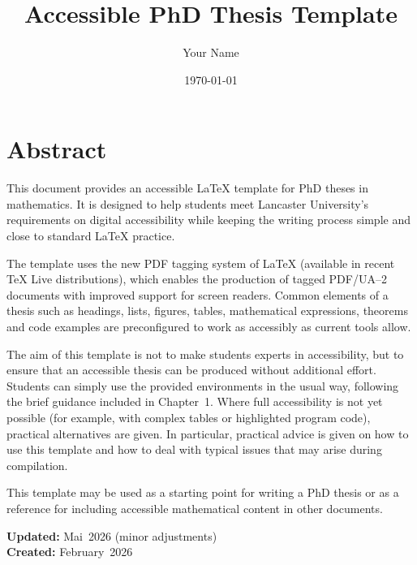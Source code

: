 \documentclass[a4paper,12pt,twoside,openright]{book}
\title{\Huge Accessible PhD Thesis Template}
\author{Your Name}
\date{\today}
\numberwithin{equation}{section}
\numberwithin{figure}{section}
\numberwithin{table}{section}
\begin{document}
\frontmatter
\maketitle
\chapter*{Abstract}

This document provides an accessible \LaTeX{} template for PhD theses in
mathematics. It is designed to help students meet Lancaster University's
requirements on digital accessibility while keeping the writing process simple
and close to standard \LaTeX{} practice.

The template uses the new PDF tagging system of \LaTeX{} (available in recent
\TeX{} Live distributions), which enables the production of tagged PDF/UA--2
documents with improved support for screen readers.  Common elements of a thesis
such as headings, lists, figures, tables, mathematical expressions, theorems and
code examples are preconfigured to work as accessibly as current tools allow.

The aim of this template is not to make students experts in accessibility, but
to ensure that an accessible thesis can be produced without additional effort.
Students can simply use the provided environments in the usual way, following
the brief guidance included in Chapter~1.  Where full accessibility is not yet
possible (for example, with complex tables or highlighted program code),
practical alternatives are given.
In particular, practical advice is given on how to use this template and how to deal with typical issues that may arise during compilation.

This template may be used as a starting point for writing a PhD thesis or as a
reference for including accessible mathematical content in other documents.

\vspace{1em}
\textbf{Updated:} Mai~2026 (minor adjustments) \\
\textbf{Created:} February~2026 %
\end{document}
